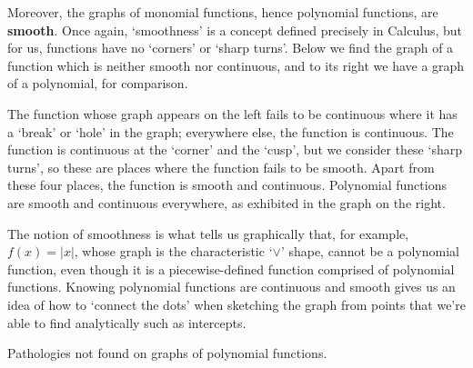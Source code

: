 \documentclass{ximera}
\begin{document}

Moreover, the graphs of monomial functions, hence polynomial functions, are  \textbf{smooth}.  Once again, `smoothness' is a concept defined precisely in Calculus, but for us,  functions have no `corners' or `sharp turns'.  Below we find the graph of a function which is neither smooth nor continuous, and to its right we have a graph of a polynomial, for comparison.  


The function whose graph appears on the left fails to be continuous where it has a `break' or `hole' in the graph;  everywhere else, the function is continuous.  The function is continuous at the `corner' and the `cusp', but we consider these `sharp turns', so these are places where the function fails to be smooth.  Apart from these four places, the function is smooth and continuous.  Polynomial functions are smooth and continuous everywhere, as exhibited in the graph on the right.  


The notion of smoothness is what tells us graphically that, for example, $f(x) = |x|$, whose graph is the characteristic `$\vee$' shape, cannot be a polynomial function, even though it is a piecewise-defined function comprised of polynomial functions.   Knowing polynomial functions are continuous and smooth gives us an idea of how to `connect the dots' when sketching the graph from points that we're able to find analytically such as intercepts.

\begin{center}
\begin{image}
\end{image}
Pathologies not found on graphs of polynomial functions.
\end{center}
\end{document}
